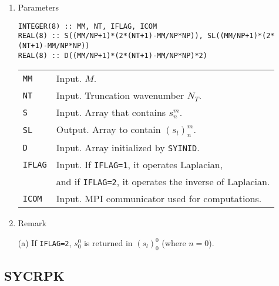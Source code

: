 \documentclass[a4paper]{scrartcl}
\begin{document}
\begin{enumerate}
\item Parameters

\begin{verbatim}
INTEGER(8) :: MM, NT, IFLAG, ICOM
REAL(8) :: S((MM/NP+1)*(2*(NT+1)-MM/NP*NP)), SL((MM/NP+1)*(2*(NT+1)-MM/NP*NP))
REAL(8) :: D((MM/NP+1)*(2*(NT+1)-MM/NP*NP)*2)
\end{verbatim}

\begin{tabular}{ll}
\texttt{MM} & Input. $M$.\\  
\texttt{NT} & Input. Truncation wavenumber $N_T$.\\
\texttt{S} & Input. Array that contains $s^m_n$.\\
\texttt{SL} & Output. Array to contain $(s_l)^m_n$.\\
\texttt{D} & Input. Array initialized by  \texttt{SYINID}.\\
\texttt{IFLAG} & Input. If \texttt{IFLAG=1}, it operates Laplacian, \\
&  and if \texttt{IFLAG=2}, it operates the 
inverse of Laplacian.\\
\texttt{ICOM} & Input. MPI communicator used for computations.
\end{tabular}

\item Remark

(a) If \texttt{IFLAG=2}, $s^0_0$ is returned in $(s_l)^0_0$ (where $n=0$).    

\end{enumerate}


\subsection{SYCRPK}
\end{document}
